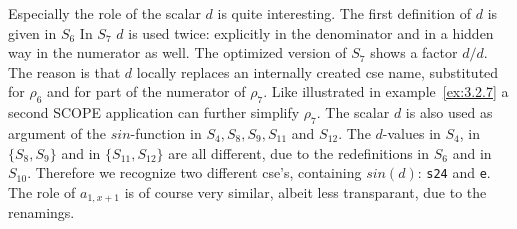 Especially the role of the scalar $d$ is quite interesting. The first definition
of $d$ is given in $S_6$ In $S_7$ $d$ is used twice: explicitly in the 
denominator and in a hidden way in the numerator as well. The optimized 
version of $S_7$ shows a factor $d/d$. The reason is that $d$ locally replaces
an internally created cse name, substituted for ${\rho}_6$ and for part of the 
numerator of ${\rho}_7$. Like illustrated in example~\ref{ex:3.2.7} a second
SCOPE application can further simplify ${\rho}_7$. The scalar $d$ is also used
as argument of the $sin$-function in $S_4 , S_8 , S_9 , S_{11}$ and $S_{12}$. 
The $d$-values in $S_4$, in $\{ S_8 , S_9 \}$ and in $\{ S_{11} , S_{12} \}$ 
are all different, due to the redefinitions in $S_6$ and in $S_{10}$. Therefore 
we recognize two different cse's, containing $sin(d)$: {\tt s24} and {\tt e}.
The role of $a_{1,x+1}$ is of course very similar, albeit less transparant,
due to the renamings.

